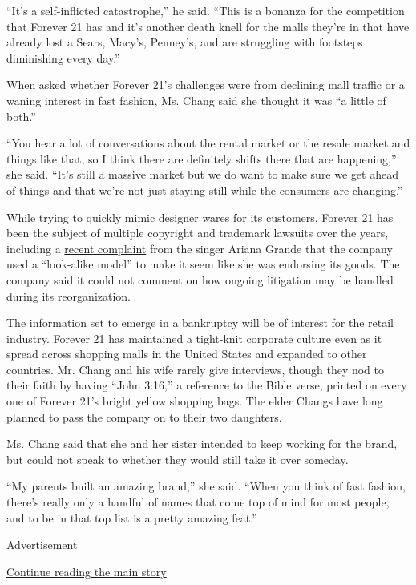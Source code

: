 ``It's a self-inflicted catastrophe,'' he said. ``This is a bonanza for
the competition that Forever 21 has and it's another death knell for the
malls they're in that have already lost a Sears, Macy's, Penney's, and
are struggling with footsteps diminishing every day.''

When asked whether Forever 21's challenges were from declining mall
traffic or a waning interest in fast fashion, Ms. Chang said she thought
it was ``a little of both.''

``You hear a lot of conversations about the rental market or the resale
market and things like that, so I think there are definitely shifts
there that are happening,'' she said. ``It's still a massive market but
we do want to make sure we get ahead of things and that we're not just
staying still while the consumers are changing.''

While trying to quickly mimic designer wares for its customers, Forever
21 has been the subject of multiple copyright and trademark lawsuits
over the years, including a
\href{https://www.nytimes3xbfgragh.onion/2019/09/03/arts/music/ariana-grande-forever-21.html}{recent
complaint} from the singer Ariana Grande that the company used a
``look-alike model'' to make it seem like she was endorsing its goods.
The company said it could not comment on how ongoing litigation may be
handled during its reorganization.

The information set to emerge in a bankruptcy will be of interest for
the retail industry. Forever 21 has maintained a tight-knit corporate
culture even as it spread across shopping malls in the United States and
expanded to other countries. Mr. Chang and his wife rarely give
interviews, though they nod to their faith by having ``John 3:16,'' a
reference to the Bible verse, printed on every one of Forever 21's
bright yellow shopping bags. The elder Changs have long planned to pass
the company on to their two daughters.

Ms. Chang said that she and her sister intended to keep working for the
brand, but could not speak to whether they would still take it over
someday.

``My parents built an amazing brand,'' she said. ``When you think of
fast fashion, there's really only a handful of names that come top of
mind for most people, and to be in that top list is a pretty amazing
feat.''

Advertisement

\protect\hyperlink{after-bottom}{Continue reading the main story}

